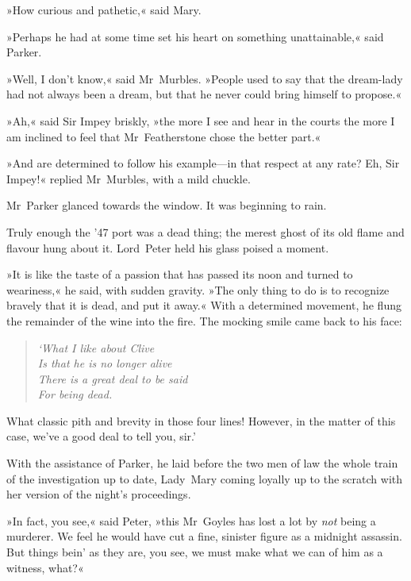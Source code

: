 »How curious and pathetic,« said Mary.

»Perhaps he had at some time set his heart on something unattainable,« said Parker.

»Well, I don't know,« said Mr~Murbles. »People used to say that the dream-lady had not always been a dream, but that he never could bring himself to propose.«

»Ah,« said Sir Impey briskly, »the more I see and hear in the courts the more I am inclined to feel that Mr~Featherstone chose the better part.«

»And are determined to follow his example—in that respect at any rate?  Eh, Sir Impey!« replied Mr~Murbles, with a mild chuckle.

Mr~Parker glanced towards the window. It was beginning to rain.

Truly enough the '47 port was a dead thing; the merest ghost of its old flame and flavour hung about it. Lord~Peter held his glass poised a moment.

»It is like the taste of a passion that has passed its noon and turned to weariness,« he said, with sudden gravity. »The only thing to do is to recognize bravely that it is dead, and put it away.« With a determined movement, he flung the remainder of the wine into the fire.  The mocking smile came back to his face: 
\begin{quote}\itshape
`What I like about Clive\\
Is that he is no longer alive\longdash \\
There is a great deal to be said\\
For being dead.\\
\end{quote}
\vspace{-4ex}
What classic pith and brevity in those four lines! However, in the matter of this case, we've a good deal to tell you, sir.'

With the assistance of Parker, he laid before the two men of law the whole train of the investigation up to date, Lady~Mary coming loyally up to the scratch with her version of the night's proceedings.

»In fact, you see,« said Peter, »this Mr~Goyles has lost a lot by \textit{not} being a murderer. We feel he would have cut a fine, sinister figure as a midnight assassin. But things bein' as they are, you see, we must make what we can of him as a witness, what?«

